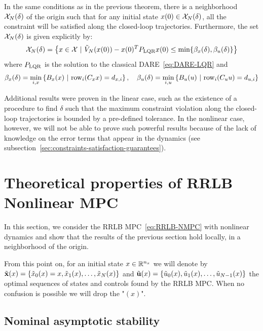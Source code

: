 \documentclass[12pt]{article}
\begin{document}
\begin{theorem}
	\label{constraint-satisfaction-guarantee-linear-case}
	In the same conditions as in the previous theorem, there is a neighborhood $\cal{X}_N(\delta)$ of the origin such that for any initial state $x(0)\in\cal{X}_N(\delta)$, all the constraint will be satisfied along the closed-loop trajectories.
	Furthermore, the set $\cal{X}_N(\delta)$ is given explicitly by:
	$$\cal{X}_N(\delta)=\left\{x\in\cal{X}~|~\tilde{V}_N(x(0))-x(0)^TP_{\rm{LQR}}x(0)\leq\min\{\beta_x(\delta),\beta_u(\delta)\}\right\}$$
	where $P_{\rm{LQR}}$ is the solution to the classical DARE~\ref{eq:DARE-LQR} and
	$$\beta_x(\delta)=\underset{i,x}{\min}\left\{ B_x(x)~|~\rm{row}_i(C_xx)=d_{x,i} \right\},\quad \beta_u(\delta)=\underset{i,u}{\min}\left\{ B_u(u)~|~\rm{row}_i(C_uu)=d_{u,i} \right\}$$
\end{theorem}

\noindent Additional results were proven in the linear case, such as the existence of a procedure to find $\delta$ such that the maximum constraint violation along the closed-loop trajectories is bounded by a pre-defined tolerance.
In the nonlinear case, however, we will not be able to prove such powerful results because of the lack of knowledge on the error terms that appear in the dynamics (see subsection~\ref{sec:constraints-satisfaction-guarantees}).

\section{Theoretical properties of RRLB Nonlinear MPC}\label{sec:RRLB-theoretical-properties}

In this section, we consider the RRLB MPC~\ref{eq:RRLB-NMPC} with nonlinear dynamics and show that the results of the previous section hold locally, in a neighborhood of the origin.

From this point on, for an initial state $x\in\R^{n_x}$ we will denote by \newline
$\tilde{\bf{x}}(x)=\left\{ \tilde{x}_0(x)=x,\tilde{x}_1(x),\ldots,\tilde{x}_N(x) \right\}$ and $\tilde{\bf{u}}(x)=\left\{ \tilde{u}_0(x),\tilde{u}_1(x),\ldots,\tilde{u}_{N-1}(x) \right\}$ the optimal sequences of states and controls found by the RRLB MPC.
When no confusion is possible we will drop the "$(x)$".

\subsection{Nominal asymptotic stability}\label{sec:RRLB-nominal-stability}
\end{document}
